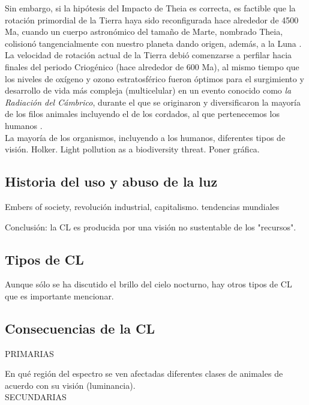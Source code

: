 Sin embargo, si la hipótesis del Impacto de Theia es correcta, es factible que la rotación primordial de la Tierra haya sido reconfigurada hace alrededor de 4500 Ma, cuando un cuerpo astronómico del tamaño de Marte, nombrado Theia, colisionó tangencialmente con nuestro planeta dando origen, además, a la Luna \citep{Stevenson1987}.\\

La velocidad de rotación actual de la Tierra debió comenzarse a perfilar hacia finales del periodo Criogénico (hace alrededor de 600 Ma), al mismo tiempo que los niveles de oxígeno y ozono estratosférico fueron óptimos para el surgimiento y desarrollo de vida más compleja (multicelular) en un evento conocido como \textit{la Radiación del Cámbrico}, durante el que se originaron y diversificaron la mayoría de los filos animales incluyendo el de los cordados, al que pertenecemos los humanos \citep{Conway2000}.\\

La mayoría de los organismos, incluyendo a los humanos, diferentes tipos de visión. Holker. Light pollution as a biodiversity threat. Poner gráfica.

\subsection{Historia del uso y abuso de la luz}

Embers of society, revolución industrial, capitalismo. tendencias mundiales 

Conclusión: la CL es producida por una visión no sustentable de los "recursos".

\subsection{Tipos de CL} 

Aunque sólo se ha discutido el brillo del cielo nocturno, hay otros tipos de CL que es importante mencionar. 

\subsection{Consecuencias de la CL}

PRIMARIAS

En qué región del espectro se ven afectadas diferentes clases de animales de acuerdo con su visión (luminancia).\\

SECUNDARIAS

